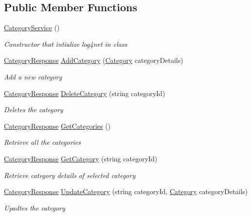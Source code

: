 \subsection*{Public Member Functions}
\begin{DoxyCompactItemize}
\item 
\hyperlink{classWildLifeTracker_1_1CategoryService_a722357258ec21820efef6f642906457c}{Category\+Service} ()
\begin{DoxyCompactList}\small\item\em Constructor that intialize log4net in class \end{DoxyCompactList}\item 
\hyperlink{classWildLifeTracker_1_1Response_1_1CategoryResponse}{Category\+Response} \hyperlink{classWildLifeTracker_1_1CategoryService_ab22f6cdfb39adc2607dc86cb100889fc}{Add\+Category} (\hyperlink{classWildLifeTracker_1_1Models_1_1Category}{Category} category\+Details)
\begin{DoxyCompactList}\small\item\em Add a new category \end{DoxyCompactList}\item 
\hyperlink{classWildLifeTracker_1_1Response_1_1CategoryResponse}{Category\+Response} \hyperlink{classWildLifeTracker_1_1CategoryService_a6479e2a6945b14d40e8c57642e9d2665}{Delete\+Category} (string category\+Id)
\begin{DoxyCompactList}\small\item\em Deletes the category \end{DoxyCompactList}\item 
\hyperlink{classWildLifeTracker_1_1Response_1_1CategoryResponse}{Category\+Response} \hyperlink{classWildLifeTracker_1_1CategoryService_af5ed969c812807a721f06819c9b22356}{Get\+Categories} ()
\begin{DoxyCompactList}\small\item\em Retrieve all the categories \end{DoxyCompactList}\item 
\hyperlink{classWildLifeTracker_1_1Response_1_1CategoryResponse}{Category\+Response} \hyperlink{classWildLifeTracker_1_1CategoryService_ac989af6747cc8b28f508ef7a4645d22f}{Get\+Category} (string category\+Id)
\begin{DoxyCompactList}\small\item\em Retrieve category details of selected category \end{DoxyCompactList}\item 
\hyperlink{classWildLifeTracker_1_1Response_1_1CategoryResponse}{Category\+Response} \hyperlink{classWildLifeTracker_1_1CategoryService_adbaa7c66fd8789233e4d6f91ab3a4a2f}{Update\+Category} (string category\+Id, \hyperlink{classWildLifeTracker_1_1Models_1_1Category}{Category} category\+Details)
\begin{DoxyCompactList}\small\item\em Upadtes the category \end{DoxyCompactList}\end{DoxyCompactItemize}
